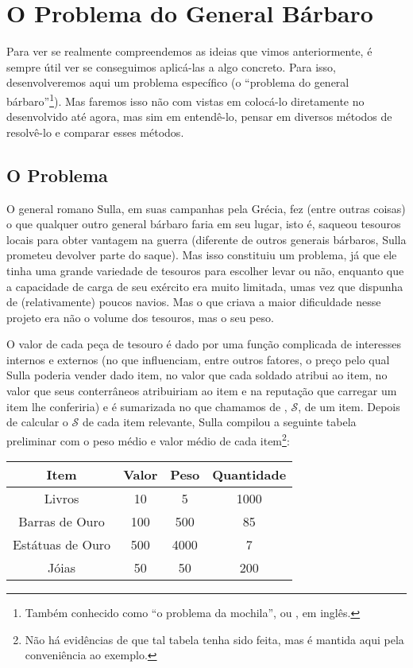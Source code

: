 \documentclass{article}
\begin{document}
\section{O Problema do General Bárbaro}

Para ver se realmente compreendemos as ideias que vimos
anteriormente, é sempre útil ver se conseguimos aplicá-las a algo
concreto. Para isso, desenvolveremos aqui um problema específico (o
``problema do general bárbaro''\footnote{Também conhecido como ``o
  problema da mochila'', ou , em
  inglês.}). Mas faremos isso não com vistas em colocá-lo
diretamente no  desenvolvido até agora, mas sim
em entendê-lo, pensar em diversos métodos de resolvê-lo e comparar
esses métodos.

\subsection{O Problema}

O general romano Sulla, em suas campanhas pela Grécia, fez (entre
outras coisas) o que qualquer outro general bárbaro faria em seu
lugar, isto é, saqueou tesouros locais para obter vantagem na guerra
(diferente de outros generais bárbaros, Sulla prometeu devolver parte
do saque). Mas isso constituiu um problema, já que ele tinha uma
grande variedade de tesouros para escolher levar ou não, enquanto que
a capacidade de carga de seu exército era muito limitada, umas vez que
dispunha de (relativamente) poucos navios. Mas o que criava a maior
dificuldade nesse projeto era não o volume dos tesouros, mas o seu
peso.

O valor de cada peça de tesouro é dado por uma função complicada de
interesses internos e externos (no que influenciam, entre outros
fatores, o preço pelo qual Sulla poderia vender dado item, no valor
que cada soldado atribui ao item, no valor que seus conterrâneos
atribuiriam ao item e na reputação que carregar um item lhe
conferiria) e é sumarizada no que chamamos de ,
$\mathscr{S}$, de um item. Depois de calcular o $\mathscr{S}$ de cada
item relevante, Sulla compilou a seguinte tabela preliminar com o peso
médio e valor médio de cada item\footnote{Não há evidências de que tal
  tabela tenha sido feita, mas é mantida aqui pela conveniência ao
  exemplo.}:


\begin{center}
  \begin{tabular}{c|c|c|c}
    Item & Valor & Peso & Quantidade\\ \hline Livros & 10 & 5 & 1000
    \\ Barras de Ouro & 100 & 500 & 85 \\ Estátuas de Ouro & 500 &
    4000 & 7 \\ Jóias & 50 & 50 & 200 \\
  \end{tabular}
\end{center}
\end{document}
